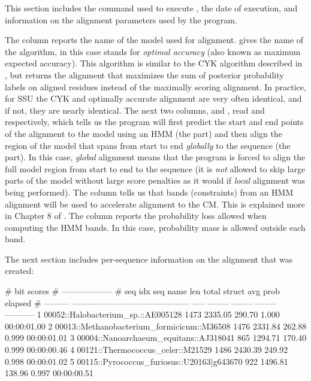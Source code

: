 This section includes the command used to execute , the
date of execution, and information on the alignment parameters used by
the program.

The  column reports the name of the model used for
alignment.  gives the name of the algorithm, in this
case  stands for \emph{optimal accuracy} \cite{Holmes98}
(also known as maximum expected accuracy). This algorithm is similar
to the CYK algorithm described in \cite{Nawrocki09b}, but returns the
alignment that maximizes the sum of posterior probability labels on
aligned residues instead of the maximally scoring alignment. In
practice, for SSU the CYK and optimally accurate alignment are very often
identical, and if not, they are nearly identical.  The next two
columns,  and , read  and
 respectively, which tells us the program will first predict
the start and end points of the alignment to the model using an HMM
(the  part) and then align the region of the model that
spans from start to end \emph{globally} to the sequence (the
 part). In this case, \emph{global} alignment means that
the program is forced to align the full model region from start to end
to the sequence (it is \emph{not} allowed to skip large parts of the
model without large score penalties as it would if \emph{local}
alignment was being performed). The  column tells us that
bands (constraints) from an HMM alignment will be used to accelerate
alignment to the CM. This is explained more in Chapter 8 of
\cite{Nawrocki09b}. The  column reports the probability loss
allowed when computing the HMM bands. In this case, 
probability mass is allowed outside each band.

The next section includes per-sequence information on the alignment
that was created:

\begin{sreoutputtiny}
#                                                                  bit scores                            
#                                                               ------------------                       
#   seq idx  seq name                                      len     total    struct  avg prob      elapsed
# ---------  ------------------------------------------  -----  --------  --------  --------  -----------
          1  00052::Halobacterium_sp.::AE005128           1473   2335.05    290.70     1.000  00:00:01.00
          2  00013::Methanobacterium_formicicum::M36508   1476   2331.84    262.88     0.999  00:00:01.01
          3  00004::Nanoarchaeum_equitans::AJ318041        865   1294.71    170.40     0.999  00:00:00.46
          4  00121::Thermococcus_celer::M21529            1486   2430.39    249.92     0.998  00:00:01.02
          5  00115::Pyrococcus_furiosus::U20163|g643670    922   1496.81    138.96     0.997  00:00:00.51
\end{sreoutputtiny}

